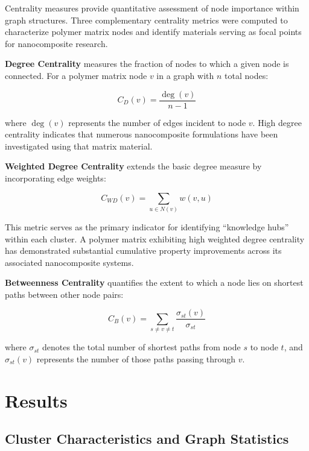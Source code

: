 \documentclass[conference]{IEEEtran}
\begin{document}
Centrality measures provide quantitative assessment of node importance within graph structures. Three complementary centrality metrics were computed to characterize polymer matrix nodes and identify materials serving as focal points for nanocomposite research.

\textbf{Degree Centrality} measures the fraction of nodes to which a given node is connected. For a polymer matrix node $v$ in a graph with $n$ total nodes:

\begin{equation}
C_D(v) = \frac{\deg(v)}{n-1}
\label{eq:degree}
\end{equation}

where $\deg(v)$ represents the number of edges incident to node $v$. High degree centrality indicates that numerous nanocomposite formulations have been investigated using that matrix material.

\textbf{Weighted Degree Centrality} extends the basic degree measure by incorporating edge weights:

\begin{equation}
C_{WD}(v) = \sum_{u \in N(v)} w(v, u)
\label{eq:weighted_degree}
\end{equation}

This metric serves as the primary indicator for identifying ``knowledge hubs'' within each cluster. A polymer matrix exhibiting high weighted degree centrality has demonstrated substantial cumulative property improvements across its associated nanocomposite systems.

\textbf{Betweenness Centrality} quantifies the extent to which a node lies on shortest paths between other node pairs:

\begin{equation}
C_B(v) = \sum_{s \neq v \neq t} \frac{\sigma_{st}(v)}{\sigma_{st}}
\label{eq:betweenness}
\end{equation}

where $\sigma_{st}$ denotes the total number of shortest paths from node $s$ to node $t$, and $\sigma_{st}(v)$ represents the number of those paths passing through $v$.

\section{Results}

\subsection{Cluster Characteristics and Graph Statistics}
\end{document}
